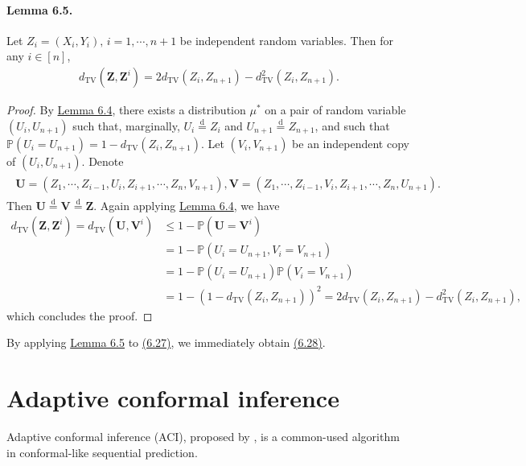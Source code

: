\documentclass{article}
\numberwithin{equation}{section}
\begin{document}
\paragraph{Lemma 6.5. \label{Lemma 6.5}} Let $Z_i=(X_i,Y_i),\,i=1,\cdots,n+1$ be independent random variables. Then for any $i\in[n]$,
\begin{align*}
	d_\mathrm{TV}\left(\mathbf{Z},\mathbf{Z}^i\right) = 2d_\mathrm{TV}\left(Z_i,Z_{n+1}\right) - d_\mathrm{TV}^2\left(Z_i,Z_{n+1}\right).\tag{6.35}
\end{align*}
\begin{proof}
By \hyperref[Lemma 6.4]{Lemma 6.4}, there exists a distribution $\mu^*$ on a pair of random variable $(U_i,U_{n+1})$ such that, marginally, $U_i\overset{\mathrm{d}}{=}Z_i$ and $U_{n+1}\overset{\mathrm{d}}{=}Z_{n+1}$, and such that $\mathbb{P}\left(U_i=U_{n+1}\right) = 1-d_\mathrm{TV}(Z_i,Z_{n+1})$. Let $(V_i,V_{n+1})$ be an independent copy of $(U_i,U_{n+1})$. Denote
\begin{align*}
	\begin{aligned}
	\mathbf{U}=(Z_1,\cdots,Z_{i-1},U_i,Z_{i+1},\cdots,Z_n,V_{n+1}),
	\mathbf{V}=(Z_1,\cdots,Z_{i-1},V_i,Z_{i+1},\cdots,Z_n,U_{n+1}).
	\end{aligned}\tag{6.36}
\end{align*} 
Then $\mathbf{U}\overset{\mathrm{d}}{=}\mathbf{V}\overset{\mathrm{d}}{=}\mathbf{Z}.$ Again applying  \hyperref[Lemma 6.4]{Lemma 6.4}, we have
\begin{align*}
	d_\mathrm{TV}(\mathbf{Z},\mathbf{Z}^i) = d_\mathrm{TV}\left(\mathbf{U},\mathbf{V}^i\right) &\leq 1 - \mathbb{P}\left(\mathbf{U} = \mathbf{V}^i\right)\\
	&= 1 - \mathbb{P}\left(U_{i} = U_{n+1},V_{i} = V_{n+1}\right)\\
	&= 1 - \mathbb{P}\left(U_{i} = U_{n+1}\right)\mathbb{P}\left(V_{i} = V_{n+1}\right)\\
	&= 1 - \left(1 - d_\mathrm{TV}\left(Z_i,Z_{n+1}\right)\right)^2 = 2d_\mathrm{TV}\left(Z_i,Z_{n+1}\right) - d_\mathrm{TV}^2\left(Z_i,Z_{n+1}\right),\tag{6.37}
\end{align*}
which concludes the proof.
\end{proof}

By applying \hyperref[Lemma 6.5]{Lemma 6.5} to \hyperref[6.27]{(6.27)}, we immediately obtain \hyperref[6.28]{(6.28)}.

\section{Adaptive conformal inference}
Adaptive conformal inference (ACI), proposed by \cite{GC}, is a common-used algorithm in conformal-like sequential prediction.
\end{document}
